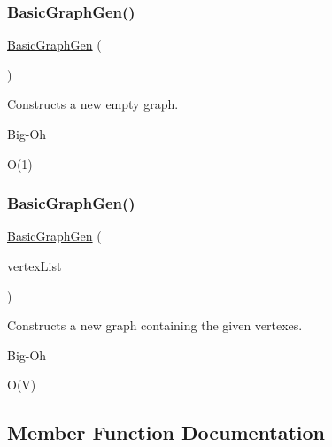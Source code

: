 \subsubsection{\texorpdfstring{Basic\+Graph\+Gen()}{BasicGraphGen()}\hspace{0.1cm}{\footnotesize\ttfamily [1/2]}}
{\footnotesize\ttfamily \mbox{\hyperlink{classBasicGraphGen}{Basic\+Graph\+Gen}} (\begin{DoxyParamCaption}{ }\end{DoxyParamCaption})}



Constructs a new empty graph. 

\begin{DoxyRefDesc}{Big-\/\+Oh}
\item[\mbox{\hyperlink{BigOh__BigOh000001}{Big-\/\+Oh}}]O(1) \end{DoxyRefDesc}
\mbox{\label{classBasicGraphGen_aa8af075f69d803e4a813e4d348150fc5}} 
\subsubsection{\texorpdfstring{Basic\+Graph\+Gen()}{BasicGraphGen()}\hspace{0.1cm}{\footnotesize\ttfamily [2/2]}}
{\footnotesize\ttfamily \mbox{\hyperlink{classBasicGraphGen}{Basic\+Graph\+Gen}} (\begin{DoxyParamCaption}\item[{std\+::initializer\+\_\+list$<$ std\+::string $>$}]{vertex\+List }\end{DoxyParamCaption})}



Constructs a new graph containing the given vertexes. 

\begin{DoxyRefDesc}{Big-\/\+Oh}
\item[\mbox{\hyperlink{BigOh__BigOh000002}{Big-\/\+Oh}}]O(\+V) \end{DoxyRefDesc}


\subsection{Member Function Documentation}
\mbox{\label{classGraph_aad2e9fedd7110ae2fb6873c5e2d29941}} 
